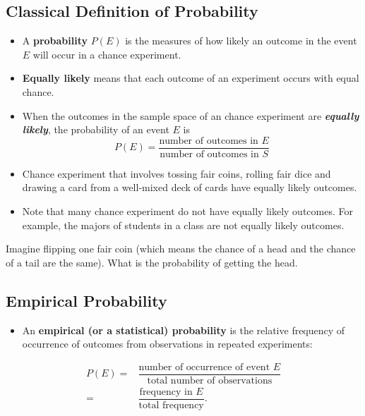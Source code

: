 \hypertarget{classical-definition-of-probability}{%
\subsection{Classical Definition of
Probability}\label{classical-definition-of-probability}}

\begin{itemize}
\item
  A \textbf{probability} \(P(E)\) is the measures of how likely an
  outcome in the event \(E\) will occur in a chance experiment.
\item
  \textbf{Equally likely} means that each outcome of an experiment
  occurs with equal chance.
\item
  When the outcomes in the sample space of an chance experiment are
  \textbf{\emph{equally likely}}, the probability of an event \(E\) is
  \[P(E)=\dfrac{\text{number of outcomes in }E}{\text{number of outcomes in }S}\]
\item
  Chance experiment that involves tossing fair coins, rolling fair dice
  and drawing a card from a well-mixed deck of cards have equally likely
  outcomes.
\item
  Note that many chance experiment do not have equally likely outcomes.
  For example, the majors of students in a class are not equally likely
  outcomes.
\end{itemize}

\begin{example}

Imagine flipping one fair coin (which means the chance of a head and the
chance of a tail are the same). What is the probability of getting the
head.

\end{example}
\vspace*{5\baselineskip}

\hypertarget{empirical-probability}{%
\subsection{Empirical Probability}\label{empirical-probability}}

\begin{itemize}
\item
  An \textbf{empirical (or a statistical) probability} is the relative
  frequency of occurrence of outcomes from observations in repeated
  experiments:
\end{itemize}

\[
\begin{aligned}
  P(E)=&\dfrac{\text{number of occurrence of event } E}{\text{total number of observations}}\\[0.5em]
  =&\dfrac{\text{frequency in }E}{\text{total frequency}}.
\end{aligned}
\]

